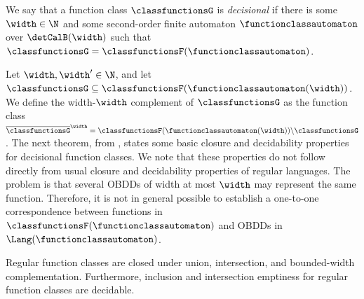 We say that a function class $\classfunctionsG$ is {\em decisional} if there is some $\width\in \N$ and some second-order finite automaton $\functionclassautomaton$ over $\detCalB(\width)$ such that $\classfunctionsG = \classfunctionsF(\functionclassautomaton)$. 

Let $\width,\width'\in \N$, and let $\classfunctionsG\subseteq \classfunctionsF(\functionclassautomaton(\width))$. We define the width-$\width$ complement of $\classfunctionsG$ as the function class $\overline{\classfunctionsG}^{\width} = \classfunctionsF(\functionclassautomaton(\width))\backslash \classfunctionsG$.
The next theorem, from \cite{MeloOliveira2022}, states some basic closure and decidability properties for decisional function classes. 
We note that these properties do not follow directly from usual closure and decidability properties of regular languages. The problem is that several OBDDs of width at most $\width$ may represent the same function. Therefore, it is not in general possible to establish a one-to-one correspondence between functions in $\classfunctionsF(\functionclassautomaton)$ and OBDDs in $\Lang(\functionclassautomaton)$.

\begin{theorem}
\label{theorem:MeloOliveira}
Regular function classes are closed under union, intersection, and bounded-width complementation. Furthermore, inclusion and intersection emptiness for regular function classes are decidable.
\end{theorem}

